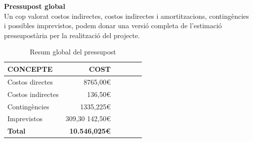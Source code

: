\begin{table}[htb]
\centering
\label{PressupostImprevistos}
\caption{Imprevistos}
\end{table}

\noindent \textbf{\large Pressupost global}\\

\noindent Un cop valorat costos indirectes, costos indirectes i amortitzacions, contingències i possibles imprevistos, podem donar una versió completa de l’estimació pressupostària per la realització del projecte.

\begin{table}[htb]
\centering
\label{PressupostGlobal}
\begin{tabular}{lrrrrr}
\hline \textbf{CONCEPTE}                           &  \textbf{COST} \\
\hline
Costos directes                         & 8765,00\euro \\
Costos indirectes                         & 136,50\euro \\
Contingències                        & 1335,225\euro \\
Imprevistos                         & 309,30 142,50\euro \\
\hline
\textbf{Total}    &     \textbf{10.546,025\euro}       \\
\hline                      
\end{tabular}%
\caption{Resum global del pressupost}
\end{table}

